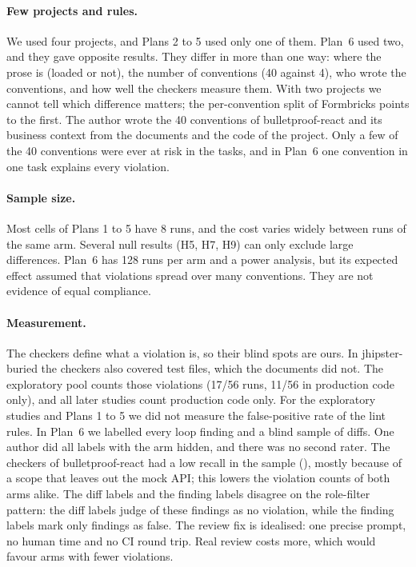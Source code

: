 \documentclass[pdflatex,sn-mathphys-num]{sn-jnl}
\begin{document}
\paragraph{Few projects and rules.}
We used four projects, and Plans 2 to 5 used only one of them.
Plan~6 used two, and they gave opposite results.
They differ in more than one way: where the prose is (loaded or not), the number of conventions (40 against 4), who wrote the conventions, and how well the checkers measure them.
With two projects we cannot tell which difference matters; the per-convention split of Formbricks points to the first.
The author wrote the 40 conventions of bulletproof-react and its business context from the documents and the code of the project.
Only a few of the 40 conventions were ever at risk in the tasks, and in Plan~6 one convention in one task explains every violation.

\paragraph{Sample size.}
Most cells of Plans 1 to 5 have 8 runs, and the cost varies widely between runs of the same arm.
Several null results (H5, H7, H9) can only exclude large differences.
Plan~6 has 128 runs per arm and a power analysis, but its expected effect assumed that violations spread over many conventions.
They are not evidence of equal compliance.

\paragraph{Measurement.}
The checkers define what a violation is, so their blind spots are ours.
In jhipster-buried the checkers also covered test files, which the documents did not.
The exploratory pool counts those violations (17/56 runs, 11/56 in production code only), and all later studies count production code only.
For the exploratory studies and Plans 1 to 5 we did not measure the false-positive rate of the lint rules.
In Plan~6 we labelled every loop finding and a blind sample of diffs.
One author did all labels with the arm hidden, and there was no second rater.
The checkers of bulletproof-react had a low recall in the sample (\PSixBPRecall), mostly because of a scope that leaves out the mock API; this lowers the violation counts of both arms alike.
The diff labels and the finding labels disagree on the role-filter pattern: the diff labels judge \PSixBPFpRole{} of these findings as no violation, while the finding labels mark only \PSixAfterFalse{} findings as false.
The review fix is idealised: one precise prompt, no human time and no CI round trip.
Real review costs more, which would favour arms with fewer violations.
\end{document}
